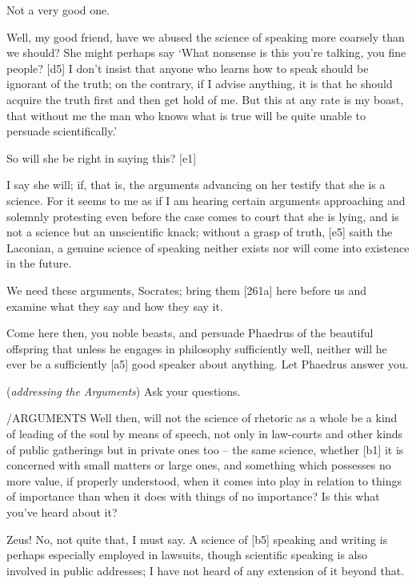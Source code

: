  Not a very good one.

 Well, my good friend, have we abused the science of speaking
more coarsely than we should? She might perhaps say ‘What nonsense is
this you're talking, you fine people? {[}d5{]} I don't insist that
anyone who learns how to speak should be ignorant of the truth; on the
contrary, if I advise anything, it is that he should acquire the truth
first and then get hold of me. But this at any rate is my boast, that
without me the man who knows what is true will be quite unable to
persuade scientifically.'

 So will she be right in saying this? {[}e1{]}

 I say she will; if, that is, the
arguments advancing on
her testify that she is a science. For it seems to me as if I am hearing
certain arguments approaching and solemnly protesting even before the
case comes to court that she is lying, and is not a science but an
unscientific knack; without a grasp of truth, {[}e5{]} saith the
Laconian, a genuine
science of speaking neither exists nor will come into existence in the
future.

 We need these arguments, Socrates; bring them {[}261a{]} here
before us and examine what they say and how they say it.

 Come here then, you noble beasts, and persuade Phaedrus of the
beautiful offspring that
unless he engages in philosophy sufficiently well, neither will he ever
be a sufficiently {[}a5{]} good speaker about anything. Let Phaedrus
answer you.

 ({\em addressing the Arguments}) Ask your questions.

/ARGUMENTS Well then, will not the science of rhetoric as a
whole be a kind of leading of the soul by means of
speech, not only in
law-courts and other kinds of public gatherings but in private ones too
-- the same science, whether {[}b1{]} it is concerned with small matters
or large ones, and something which possesses no more value, if properly
understood, when it comes into play in relation to things of importance
than when it does with things of no importance? Is this what you've
heard about it?

 Zeus! No, not quite that, I must say. A science of {[}b5{]}
speaking and writing is perhaps especially employed in lawsuits, though
scientific speaking is also involved in public addresses; I have not
heard of any extension of it beyond that.

